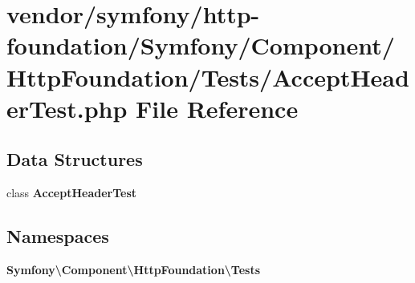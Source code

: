 \section{vendor/symfony/http-\/foundation/\+Symfony/\+Component/\+Http\+Foundation/\+Tests/\+Accept\+Header\+Test.php File Reference}
\label{_accept_header_test_8php}
\subsection*{Data Structures}
\begin{DoxyCompactItemize}
\item 
class {\bf Accept\+Header\+Test}
\end{DoxyCompactItemize}
\subsection*{Namespaces}
\begin{DoxyCompactItemize}
\item 
 {\bf Symfony\textbackslash{}\+Component\textbackslash{}\+Http\+Foundation\textbackslash{}\+Tests}
\end{DoxyCompactItemize}
